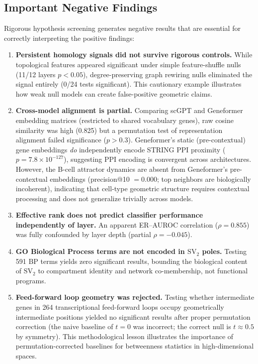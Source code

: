 \documentclass[10pt,twocolumn]{article}
\newcommand{\SV}[1]{\mathrm{SV}_{#1}}
\begin{document}
\subsection{Important Negative Findings}
\label{sec:negatives}

Rigorous hypothesis screening generates negative results that are essential for correctly interpreting the positive findings:

\begin{enumerate}
\item \textbf{Persistent homology signals did not survive rigorous controls.}
While topological features appeared significant under simple feature-shuffle nulls (11/12 layers $p < 0.05$), degree-preserving graph rewiring nulls eliminated the signal entirely (0/24 tests significant).
This cautionary example illustrates how weak null models can create false-positive geometric claims.

\item \textbf{Cross-model alignment is partial.}
Comparing scGPT and Geneformer embedding matrices (restricted to shared vocabulary genes), raw cosine similarity was high (0.825) but a permutation test of representation alignment failed significance ($p > 0.3$).
Geneformer's static (pre-contextual) gene embeddings \emph{do} independently encode STRING PPI proximity ($p = 7.8 \times 10^{-127}$), suggesting PPI encoding is convergent across architectures.
However, the B-cell attractor dynamics are absent from Geneformer's pre-contextual embeddings (precision@10 $= 0.000$; top neighbors are biologically incoherent), indicating that cell-type geometric structure requires contextual processing and does not generalize trivially across models.

\item \textbf{Effective rank does not predict classifier performance independently of layer.}
An apparent ER--AUROC correlation ($\rho = 0.855$) was fully confounded by layer depth (partial $\rho = -0.045$).

\item \textbf{GO Biological Process terms are not encoded in $\SV{2}$ poles.}
Testing 591 BP terms yields zero significant results, bounding the biological content of $\SV{2}$ to compartment identity and network co-membership, not functional programs.

\item \textbf{Feed-forward loop geometry was rejected.}
Testing whether intermediate genes in 264 transcriptional feed-forward loops occupy geometrically intermediate positions yielded no significant results after proper permutation correction (the naive baseline of $t = 0$ was incorrect; the correct null is $t \approx 0.5$ by symmetry).
This methodological lesson illustrates the importance of permutation-corrected baselines for betweenness statistics in high-dimensional spaces.
\end{enumerate}
\end{document}
